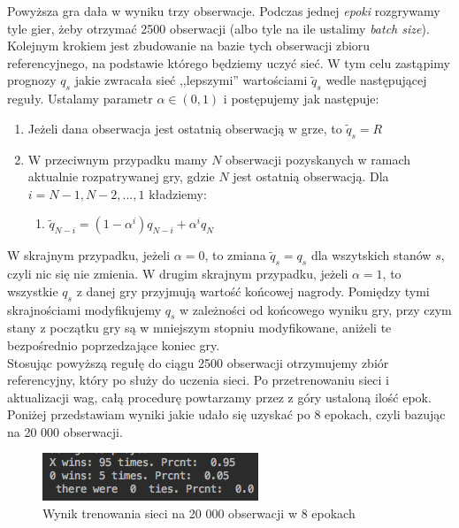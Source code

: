 \documentclass[licencjacka]{pracamgr}
\begin{document}
Powyższa gra dała w wyniku trzy obserwacje. Podczas jednej \textit{epoki} rozgrywamy tyle gier, żeby otrzymać 2500 obserwacji (albo tyle na ile ustalimy \textit{batch size}). Kolejnym krokiem jest zbudowanie na bazie tych obserwacji zbioru referencyjnego, na podstawie którego będziemy uczyć sieć. W tym celu zastąpimy prognozy $q_{s}$ jakie zwracała sieć ,,lepszymi'' wartościami $\tilde{q}_{s}$ wedle następującej reguły.  Ustalamy parametr $\alpha\in(0,1)$ i postępujemy jak następuje:


\begin{enumerate}
	\item{Jeżeli dana obserwacja jest ostatnią obserwacją w grze, to $\tilde{q}_{s}= R$}
	\item{W przeciwnym przypadku mamy  $N$ obserwacji pozyskanych w ramach aktualnie rozpatrywanej gry, gdzie $N$ jest ostatnią obserwacją.  Dla $i=N-1, N-2,...,1$ kładziemy: }
	\begin{enumerate}
		\item{$\tilde{q}_{N-i}= (1-\alpha^{i})q_{N-i} + \alpha^{i}q_{N} $}
	\end{enumerate}
\end{enumerate}
W skrajnym przypadku, jeżeli $\alpha=0$, to zmiana $\tilde{q}_{s}=q_{s}$ dla wszytskich stanów $s$, czyli nic się nie zmienia. W drugim skrajnym przypadku, jeżeli $\alpha=1$, to wszystkie $q_{s}$ z danej gry przyjmują wartość końcowej nagrody. Pomiędzy tymi skrajnościami modyfikujemy $q_{s}$ w zależności od końcowego wyniku gry, przy czym stany z początku gry są w mniejszym stopniu modyfikowane, aniżeli te bezpośrednio poprzedzające koniec gry.  \\

Stosując powyższą regułę do ciągu 2500 obserwacji otrzymujemy zbiór referencyjny, który po służy do uczenia sieci. Po przetrenowaniu sieci i aktualizacji wag, całą procedurę powtarzamy przez z góry ustaloną ilość epok. Poniżej przedstawiam wyniki jakie udało się uzyskać po 8 epokach, czyli bazując na 20 000 obserwacji.\\

\begin{figure}[h!]
	\includegraphics [scale=0.7] {nn2_1.png}
	\caption{Wynik trenowania sieci na 20 000 obserwacji w 8 epokach}
	\label{Rys30}
\end{figure} 
\end{document}
